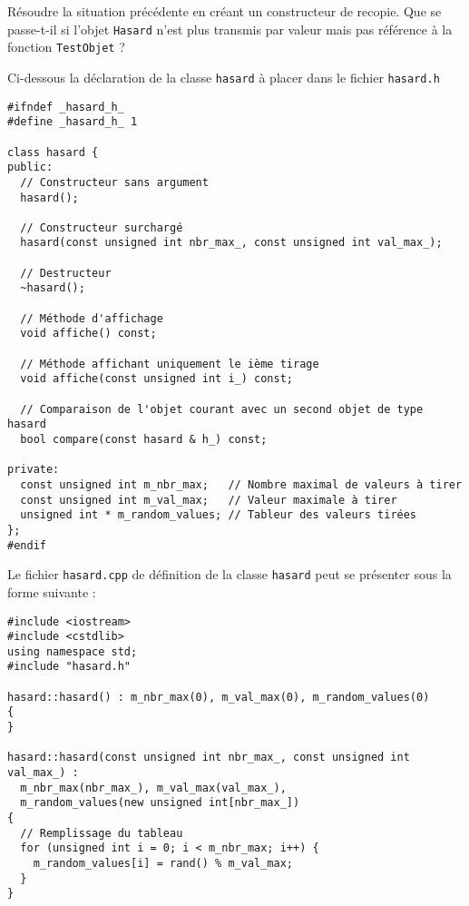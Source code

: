 \documentclass{book}
\begin{document}
Résoudre la situation précédente en créant un constructeur de recopie. Que se
passe-t-il si l'objet \texttt{Hasard} n'est plus transmis par valeur mais pas
référence à la fonction \texttt{TestObjet} ?


\begin{correction}\label{sec:orgheadline3}
Ci-dessous la déclaration de la classe \texttt{hasard} à placer dans le fichier \texttt{hasard.h}

\begin{verbatim}
#ifndef _hasard_h_
#define _hasard_h_ 1

class hasard {
public:
  // Constructeur sans argument
  hasard();

  // Constructeur surchargé
  hasard(const unsigned int nbr_max_, const unsigned int val_max_);

  // Destructeur
  ~hasard();

  // Méthode d'affichage
  void affiche() const;

  // Méthode affichant uniquement le ième tirage
  void affiche(const unsigned int i_) const;

  // Comparaison de l'objet courant avec un second objet de type hasard
  bool compare(const hasard & h_) const;

private:
  const unsigned int m_nbr_max;   // Nombre maximal de valeurs à tirer
  const unsigned int m_val_max;   // Valeur maximale à tirer
  unsigned int * m_random_values; // Tableur des valeurs tirées
};
#endif
\end{verbatim}

Le fichier \texttt{hasard.cpp} de définition de la classe \texttt{hasard} peut se présenter sous
la forme suivante :

\begin{verbatim}
#include <iostream>
#include <cstdlib>
using namespace std;
#include "hasard.h"

hasard::hasard() : m_nbr_max(0), m_val_max(0), m_random_values(0)
{
}

hasard::hasard(const unsigned int nbr_max_, const unsigned int val_max_) :
  m_nbr_max(nbr_max_), m_val_max(val_max_),
  m_random_values(new unsigned int[nbr_max_])
{
  // Remplissage du tableau
  for (unsigned int i = 0; i < m_nbr_max; i++) {
    m_random_values[i] = rand() % m_val_max;
  }
}


\end{verbatim}
\end{correction}
\end{document}
